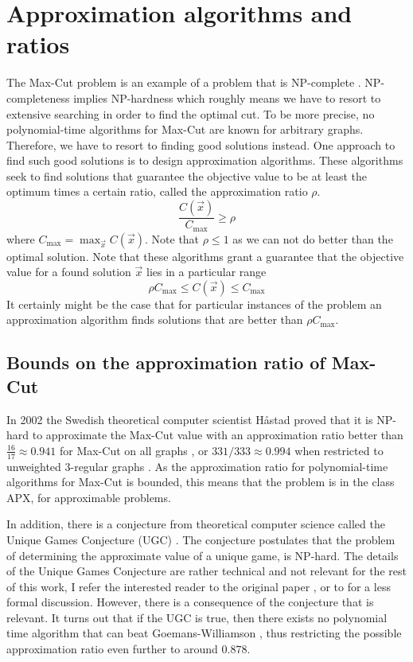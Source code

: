 \section{Approximation algorithms and ratios}
The Max-Cut problem is an example of a problem that is NP-complete \cite{Karp72}. NP-completeness implies NP-hardness which roughly means we have to resort to extensive searching in order to find the optimal cut. To be more precise, no polynomial-time algorithms for Max-Cut are known for arbitrary graphs. Therefore, we have to resort to finding good solutions instead. One approach to find such good solutions is to design approximation algorithms. These algorithms seek to find solutions that guarantee the objective value to be at least the optimum times a certain ratio, called the approximation ratio $\rho$.
\begin{equation}
\frac{C(\vec{x})}{C_{\max}} \geq \rho
\end{equation}
where $C_{\max} = \max_{\vec{x}} C(\vec{x})$. Note that $\rho \leq 1$ as we can not do better than the optimal solution. Note that these algorithms grant a guarantee that the objective value for a found solution $\vec{x}$ lies in a particular range
\begin{equation}
\rho C_{\max} \leq C(\vec{x}) \leq C_{\max} 
\end{equation}
It certainly might be the case that for particular instances of the problem an approximation algorithm finds solutions that are better than $\rho C_{\max}$.

\subsection{Bounds on the approximation ratio of Max-Cut}
In 2002 the Swedish theoretical computer scientist H\r{a}stad proved that it is NP-hard to approximate the Max-Cut value with an approximation ratio better than $\frac{16}{17} \approx 0.941$  for Max-Cut on all graphs \cite{Hastad02}, or $331/333 \approx 0.994$ when restricted to unweighted 3-regular graphs \cite{BK99}. As the approximation ratio for polynomial-time algorithms for Max-Cut is bounded, this means that the problem is in the class APX, for approximable problems.

In addition, there is a conjecture from theoretical computer science called the Unique Games Conjecture (UGC) \cite{UGC}. The conjecture postulates that the problem of determining the approximate value of a unique game, is NP-hard. The details of the Unique Games Conjecture are rather technical and not relevant for the rest of this work, I refer the interested reader to the original paper \cite{UGC}, or to \cite{UGC-Blog} for a less formal discussion. However, there is a consequence of the conjecture that is relevant. It turns out that if the UGC is true, then there exists no polynomial time algorithm that can beat Goemans-Williamson \cite{KKMO05}, thus restricting the possible approximation ratio even further to around $0.878$. 

